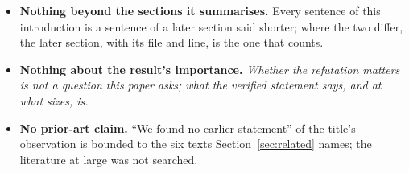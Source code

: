 \begin{itemize}
\item \textbf{Nothing beyond the sections it summarises.} Every
  sentence of this introduction is a sentence of a later section said
  shorter; where the two differ, the later section, with its file and
  line, is the one that counts.
\item \textbf{Nothing about the result's importance.} \emph{Whether the
  refutation matters is not a question this paper asks; what the
  verified statement says, and at what sizes, is.}
\item \textbf{No prior-art claim.} ``We found no earlier statement'' of
  the title's observation is bounded to the six texts
  Section~\ref{sec:related} names; the literature at large was not
  searched.
\end{itemize}
